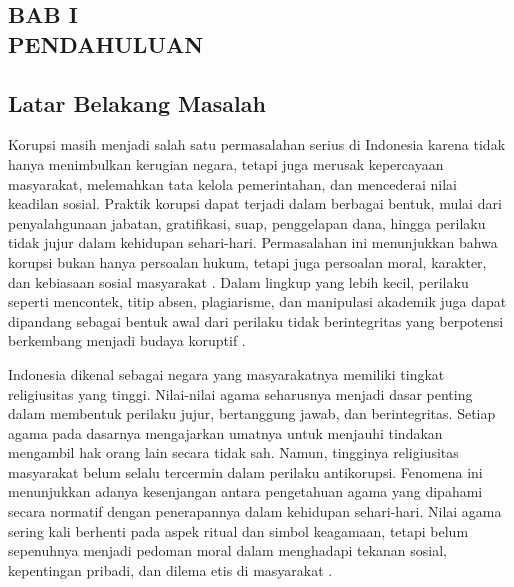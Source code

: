 \newpage
\renewcommand\thesection{1}
\renewcommand\thesubsection{\arabic{subsection}}

\setcounter{subsection}{0}


\begin{center}
    \section*{BAB I \\ PENDAHULUAN}
\end{center}

\subsection{Latar Belakang Masalah}

\begin{sloppypar}
    Korupsi masih menjadi salah satu permasalahan serius di Indonesia karena tidak hanya menimbulkan kerugian negara, tetapi juga merusak kepercayaan masyarakat, melemahkan tata kelola pemerintahan, dan mencederai nilai keadilan sosial. Praktik korupsi dapat terjadi dalam berbagai bentuk, mulai dari penyalahgunaan jabatan, gratifikasi, suap, penggelapan dana, hingga perilaku tidak jujur dalam kehidupan sehari-hari. Permasalahan ini menunjukkan bahwa korupsi bukan hanya persoalan hukum, tetapi juga persoalan moral, karakter, dan kebiasaan sosial masyarakat \citep{nainggolan2024}. Dalam lingkup yang lebih kecil, perilaku seperti mencontek, titip absen, plagiarisme, dan manipulasi akademik juga dapat dipandang sebagai bentuk awal dari perilaku tidak berintegritas yang berpotensi berkembang menjadi budaya koruptif \citep{devina2026}.
\end{sloppypar}

    Indonesia dikenal sebagai negara yang masyarakatnya memiliki tingkat religiusitas yang tinggi. Nilai-nilai agama seharusnya menjadi dasar penting dalam membentuk perilaku jujur, bertanggung jawab, dan berintegritas. Setiap agama pada dasarnya mengajarkan umatnya untuk menjauhi tindakan mengambil hak orang lain secara tidak sah. Namun, tingginya religiusitas masyarakat belum selalu tercermin dalam perilaku antikorupsi. Fenomena ini menunjukkan adanya kesenjangan antara pengetahuan agama yang dipahami secara normatif dengan penerapannya dalam kehidupan sehari-hari. Nilai agama sering kali berhenti pada aspek ritual dan simbol keagamaan, tetapi belum sepenuhnya menjadi pedoman moral dalam menghadapi tekanan sosial, kepentingan pribadi, dan dilema etis di masyarakat \citep{siagian2025,zahron2026}.

